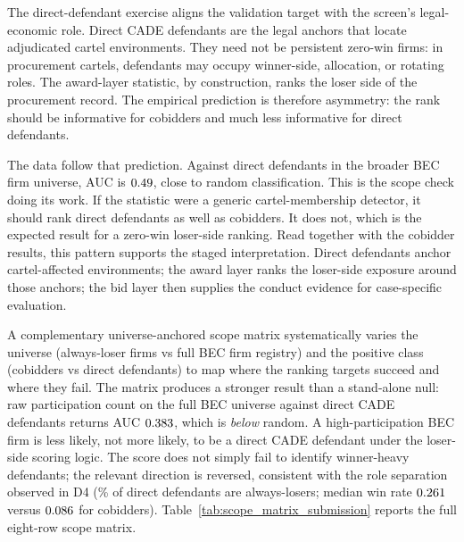 The direct-defendant exercise aligns the validation target with
the screen's legal-economic role. Direct CADE defendants are the
legal anchors that locate adjudicated cartel environments. They
need not be persistent zero-win firms: in procurement cartels,
defendants may occupy winner-side, allocation, or rotating roles.
The award-layer statistic, by construction, ranks the loser side
of the procurement record. The empirical prediction is therefore
asymmetry: the rank should be informative for cobidders and much
less informative for direct defendants.

The data follow that prediction. Against direct defendants in
the broader BEC firm universe, AUC is $0.49$, close
to random classification. This is the scope check doing its
work. If the statistic were a generic cartel-membership detector,
it should rank direct defendants as well as cobidders. It does
not, which is the expected result for a zero-win loser-side
ranking. Read together with the cobidder results, this pattern
supports the staged interpretation. Direct defendants anchor
cartel-affected environments; the award layer ranks the
loser-side exposure around those anchors; the bid layer then
supplies the conduct evidence for case-specific evaluation.

A complementary universe-anchored scope matrix systematically
varies the universe (always-loser firms vs full BEC firm
registry) and the positive class (cobidders vs direct defendants)
to map where the ranking targets succeed and where they fail. The
matrix produces a stronger result than a stand-alone null: raw
participation count on the full BEC universe against direct CADE
defendants returns AUC $0.383$, which is
\emph{below} random. A high-participation BEC firm is less
likely, not more likely, to be a direct CADE defendant under the
loser-side scoring logic. The score does not simply fail to
identify winner-heavy defendants; the relevant direction is
reversed, consistent with the role separation observed in D4
(\valDirectShareAL\% of direct defendants are always-losers; median win rate
$0.261$ versus $0.086$ for cobidders).
Table~\ref{tab:scope_matrix_submission} reports the full eight-row
scope matrix.

